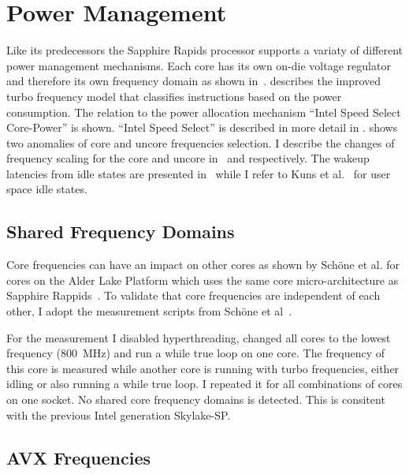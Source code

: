 \chapter{Power Management}

Like its predecessors the Sapphire Rapids processor supports a variaty of different power management mechanisms.
Each core has its own on-die voltage regulator and therefore its own frequency domain as shown in~.
 describes the improved turbo frequency model that classifies instructions based on the power consumption.
The relation to the power allocation mechanism ``Intel Speed Select Core-Power'' is shown.
``Intel Speed Select'' is described in more detail in .
 shows two anomalies of core and uncore frequencies selection.
I describe the changes of frequency scaling for the core and uncore in~ and  respectively.
The wakeup latencies from idle states are presented in~ while I refer to Kuns et al.~\cite{Kuns_2025_UserSpaceIdle} for user space idle states.

\section{Shared Frequency Domains}
\label{sec:shared_freq_domains}
Core frequencies can have an impact on other cores as shown by Schöne et al. for cores on the Alder Lake Platform which uses the same core micro-architecture as Sapphire Rappids~\cite{Schoene_2024_Alder_Lake}.
To validate that core frequencies are independent of each other, I adopt the measurement scripts from Sch\"one et al~\cite{Schoene_2024_Alder_Lake}.

For the measurement I disabled hyperthreading, changed all cores to the lowest frequency (\SI{800}{\MHz}) and run a while true loop on one core.
The frequency of this core is measured while another core is running with turbo frequencies, either idling or also running a while true loop.
I repeated it for all combinations of cores on one socket.
No shared core frequency domains is detected.
This is consitent with the previous Intel generation Skylake-SP.

\section{AVX Frequencies}
\label{sec:avx-frequencies}

